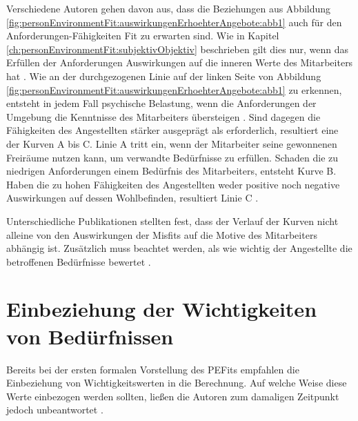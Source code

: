 Verschiedene Autoren gehen davon aus, dass die Beziehungen aus Abbildung \ref{fig:personEnvironmentFit:auswirkungenErhoehterAngebote:abb1} auch für den Anforderungen-Fähigkeiten Fit zu erwarten sind. Wie in Kapitel \ref{ch:personEnvironmentFit:subjektivObjektiv} beschrieben gilt dies nur, wenn das Erfüllen der Anforderungen Auswirkungen auf die inneren Werte des Mitarbeiters hat \cite[S. 12f.]{harrison:1978}. Wie an der durchgezogenen Linie auf der linken Seite von Abbildung \ref{fig:personEnvironmentFit:auswirkungenErhoehterAngebote:abb1} zu erkennen, entsteht in jedem Fall psychische Belastung, wenn die Anforderungen der Umgebung die Kenntnisse des Mitarbeiters übersteigen \cite[S. 5]{schuler:1980}. Sind dagegen die Fähigkeiten des Angestellten stärker ausgeprägt als erforderlich, resultiert eine der Kurven A bis C. Linie A tritt ein, wenn der Mitarbeiter seine gewonnenen Freiräume nutzen kann, um verwandte Bedürfnisse zu erfüllen. Schaden die zu niedrigen Anforderungen einem Bedürfnis des Mitarbeiters, entsteht Kurve B. Haben die zu hohen Fähigkeiten des Angestellten weder positive noch negative Auswirkungen auf dessen Wohlbefinden, resultiert Linie C \cite[S. 22f.]{edwards:2008}.

Unterschiedliche Publikationen stellten fest, dass der Verlauf der Kurven nicht alleine von den Auswirkungen der Misfits auf die Motive des Mitarbeiters abhängig ist. Zusätzlich muss beachtet werden, als wie wichtig der Angestellte die betroffenen Bedürfnisse bewertet \cite[S. 9f.]{edwards:1996}. 

\section{Einbeziehung der Wichtigkeiten von Bedürfnissen}
\label{ch:personEnvironmentFit:wichtigkeiten}
Bereits bei der ersten formalen Vorstellung des \acp{PEFit} empfahlen \textcite[S. 7]{copingAndAdaption:1974} die Einbeziehung von Wichtigkeitswerten in die Berechnung. Auf welche Weise diese Werte einbezogen werden sollten, ließen die Autoren zum damaligen Zeitpunkt jedoch unbeantwortet \cite[S. 19]{edwards:2008}.


